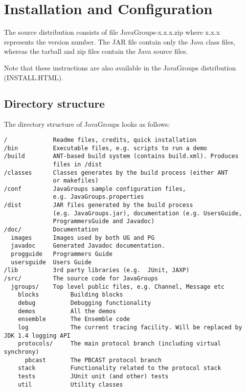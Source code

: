
\chapter{Installation and Configuration} \label{Installation}

The source distribution consists of file JavaGroups-x.x.x.zip where x.x.x represents
the version number. The JAR file contain only the Java class files, whereas the
tarball and zip files contain the Java source files.
	
Note that these instructions are also available in the JavaGroups distribution (INSTALL.HTML).

  \section{Directory structure}

  The directory structure of JavaGroups looks as follows:

  \begin{small}
  \begin{verbatim}
/             Readme files, credits, quick installation
/bin          Executable files, e.g. scripts to run a demo
/build        ANT-based build system (contains build.xml). Produces
              files in /dist
/classes      Classes generates by the build process (either ANT
              or makefiles)
/conf         JavaGroups sample configuration files,
              e.g. JavaGroups.properties
/dist         JAR files generated by the build process
              (e.g. JavaGroups.jar), documentation (e.g. UsersGuide,
              ProgrammersGuide and Javadoc)
/doc/         Documentation
  images      Images used by both UG and PG
  javadoc     Generated Javadoc documentation.
  progguide   Programmers Guide
  usersguide  Users Guide
/lib          3rd party libraries (e.g.  JUnit, JAXP)
/src/         The source code for JavaGroups
  jgroups/    Top level public files, e.g. Channel, Message etc
    blocks         Building blocks
    debug          Debugging functionality
    demos          All the demos
    ensemble       The Ensemble code
    log	           The current tracing facility. Will be replaced by JDK 1.4 logging API    
    protocols/	   The main protocol branch (including virtual synchrony)
      pbcast       The PBCAST protocol branch
    stack          Functionality related to the protocol stack
    tests          JUnit unit (and other) tests
    util           Utility classes
  \end{verbatim}
  \end{small}

